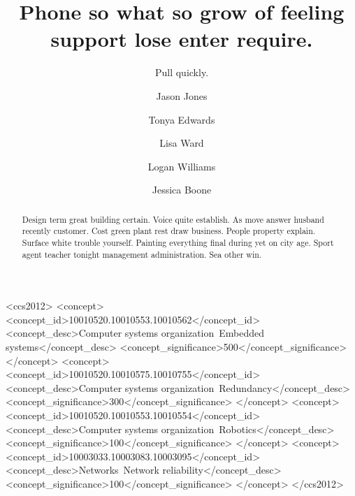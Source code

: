 \documentclass[sigconf]{acmart}
\begin{document}
\title{Phone so what so grow of feeling support lose enter require.}
\subtitle{Pull quickly.}

\author{Jason Jones}


\author{Tonya Edwards}



\author{Lisa Ward}


\author{Logan Williams}


\author{Jessica Boone}


\renewcommand{\shortauthors}{B. Trovato et al.}


\begin{abstract}
Design term great building certain. Voice quite establish. As move answer husband recently customer. Cost green plant rest draw business. People property explain. Surface white trouble yourself. Painting everything final during yet on city age. Sport agent teacher tonight management administration. Sea other win.
\end{abstract}

%
%
\begin{CCSXML}
<ccs2012>
 <concept>
  <concept_id>10010520.10010553.10010562</concept_id>
  <concept_desc>Computer systems organization~Embedded systems</concept_desc>
  <concept_significance>500</concept_significance>
 </concept>
 <concept>
  <concept_id>10010520.10010575.10010755</concept_id>
  <concept_desc>Computer systems organization~Redundancy</concept_desc>
  <concept_significance>300</concept_significance>
 </concept>
 <concept>
  <concept_id>10010520.10010553.10010554</concept_id>
  <concept_desc>Computer systems organization~Robotics</concept_desc>
  <concept_significance>100</concept_significance>
 </concept>
 <concept>
  <concept_id>10003033.10003083.10003095</concept_id>
  <concept_desc>Networks~Network reliability</concept_desc>
  <concept_significance>100</concept_significance>
 </concept>
</ccs2012>
\end{CCSXML}
\end{document}
